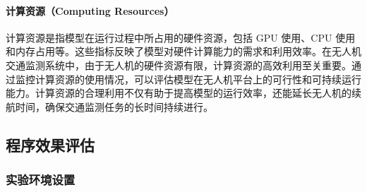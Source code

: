\documentclass[runningheads]{llncs}
\begin{document}


\paragraph{计算资源（Computing Resources）}
计算资源是指模型在运行过程中所占用的硬件资源，包括 GPU 使用、CPU 使用和内存占用等。这些指标反映了模型对硬件计算能力的需求和利用效率。在无人机交通监测系统中，由于无人机的硬件资源有限，计算资源的高效利用至关重要。通过监控计算资源的使用情况，可以评估模型在无人机平台上的可行性和可持续运行能力。计算资源的合理利用不仅有助于提高模型的运行效率，还能延长无人机的续航时间，确保交通监测任务的长时间持续进行。

\subsection{程序效果评估}

\subsubsection{实验环境设置}
\end{document}
